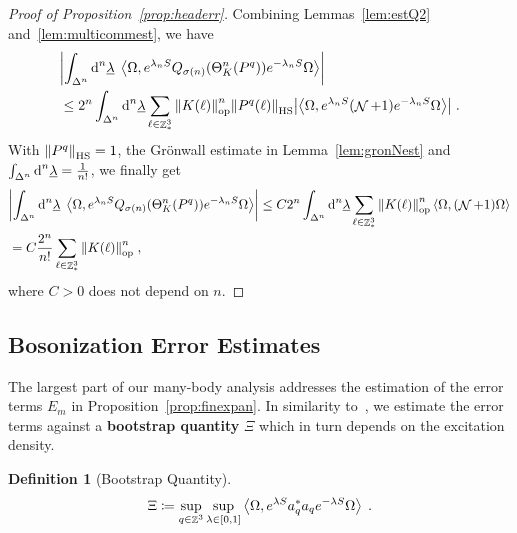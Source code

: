 \documentclass[12pt,a4paper]{article}
\numberwithin{equation}{section}
\newcommand{\ulambda}{\underline{\lambda}}
\newcommand{\1}{\mathbb{I}}
\newcommand{\di}{\textnormal{d}}
\newcommand{\HS}{\mathrm{HS}}
\DeclareMathOperator{\Z}{\mathbb{Z}}
\DeclareMathOperator{\NN}{\mathcal{N}}
\newcommand{\eva}[1]{\left\langle #1 \right\rangle}
\theoremstyle{plain}
\theoremstyle{definition}
\newtheorem{definition}[theorem]{Definition}
\theoremstyle{remark}
\theoremstyle{plain}
\theoremstyle{definition}
\theoremstyle{remark}
\begin{document}
\begin{proof}[Proof of Proposition~\ref{prop:headerr}]
Combining Lemmas~\ref{lem:estQ2} and~\ref{lem:multicommest}, we have
\begin{equation}
\begin{aligned}
	&\abs{\int_{\Delta^n} \di^n \ulambda \;
		\eva{\Omega, e^{\lambda_n S} Q_{\sigma(n)}(\Theta^n_{K}(P^q)) e^{-\lambda_n S} \Omega} } \\
	&\leq 2^n \int_{\Delta^n} \di^n \ulambda \sum_{\ell \in \Z^3_*} \norm{K(\ell)}^n_{\mathrm{op}} \norm{P^q(\ell)}_{\HS} 
		\abs{\eva{\Omega, e^{\lambda_n S} (\NN +1) e^{-\lambda_n S} \Omega}} \;.
\end{aligned}
\end{equation}
With $ \norm{P^q}_{\HS} = 1$, the Gr\"onwall estimate in Lemma~\ref{lem:gronNest} and $ \int_{\Delta^n} \di^n\underline{\lambda} = \frac{1}{n!} $, we finally get
\begin{equation}
\begin{aligned}
	&\abs{\int_{\Delta^n} \di^n \ulambda \;
		\eva{\Omega, e^{\lambda_n S} Q_{\sigma(n)}(\Theta^n_{K}(P^q)) e^{-\lambda_n S} \Omega} }
	\leq C 2^n \int_{\Delta^n} \di^n \ulambda \sum_{\ell \in \Z^3_*} \norm{K(\ell)}^n_{\mathrm{op}} \eva{\Omega,(\NN+1)\Omega} \\
	&= C \frac{2^n}{n!} \sum_{\ell \in \Z^3_*} \norm{K(\ell)}^n_{\mathrm{op}} \;,
\end{aligned}
\end{equation}
where $ C>0 $ does not depend on $ n $.
\end{proof}






\subsection{Bosonization Error Estimates}
\label{subsec:bos_error}

The largest part of our many-body analysis addresses the estimation of the error terms $ E_m $ in Proposition~\ref{prop:finexpan}. In similarity to~\cite{BL25}, we estimate the error terms against a \textbf{bootstrap quantity} $ \Xi $ which in turn depends on the excitation density.

\begin{definition}[Bootstrap Quantity]
\begin{equation} \label{eq:Xi}
	\Xi \coloneq \sup\limits_{q \in \Z^3} \sup\limits_{\lambda \in [0,1]}\expval{\Omega, e^{\lambda S} a^*_q a_q e^{-\lambda S} \Omega} \;.
\end{equation}
\end{definition}
\end{document}
